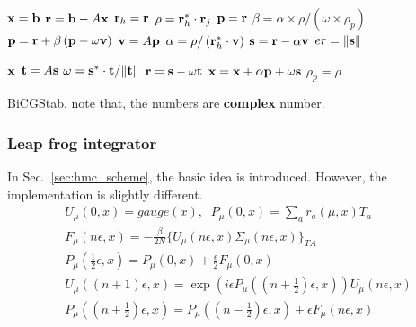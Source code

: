 \begin{algorithm}[H]
\begin{algorithmic}
\State ${\bf x}={\bf b}$
    \State ${\bf r}={\bf b}-A{\bf x}$
    \State ${\bf r}_h={\bf r}$
        \State $\rho = {\bf r}_h^* \cdot {\bf r}_j$
            \State ${\bf p}={\bf r}$
        \Else
            \State $\beta = \alpha \times \rho / (\omega \times \rho_p)$
            \State ${\bf p}={\bf r}+\beta\left({\bf p}-\omega {\bf v}\right)$
        \EndIf
        \State ${\bf v}=A{\bf p}$
        \State $\alpha = \rho / \left({\bf r}_h^*\cdot {\bf v}\right)$
        \State ${\bf s}={\bf r}-\alpha {\bf v}$
            \State $er=\|{\bf s}\|$

                \Return ${\bf x}$
            \EndIf
        \EndIf
        \State ${\bf t}=A{\bf s}$
        \State $\omega = {\bf s}^*\cdot {\bf t}/\|{\bf t}\|$
        \State ${\bf r}={\bf s}-\omega {\bf t}$
        \State ${\bf x}={\bf x}+\alpha {\bf p}+\omega {\bf s}$
        \State $\rho _p=\rho$
    \EndFor
\EndFor
\end{algorithmic}
\caption{\label{alg.BiCGStab}BiCGStab, note that, the numbers are \textbf{complex} number.}
\end{algorithm}

\subsubsection{\label{sec:Leap frog}Leap frog integrator}

In Sec.~\ref{sec:hmc_scheme}, the basic idea is introduced. However, the implementation is slightly different.
\begin{subequations}
\begin{eqnarray}
&U_{\mu}(0,x)=gauge(x),\;\;P_{\mu}(0,x)=\sum _{a}r_a(\mu,x)T_a\\
&F_{\mu}(n\epsilon,x)=-\frac{\beta}{2N}\{U_{\mu}(n\epsilon,x)\Sigma _{\mu}(n\epsilon,x)\}_{TA}\\
&P_{\mu}(\frac{1}{2}\epsilon,x)=P_{\mu}(0,x)+\frac{\epsilon}{2}F_{\mu}(0,x)\\
&U_{\mu}((n+1)\epsilon,x)=\exp \left(i\epsilon P_{\mu}((n+\frac{1}{2})\epsilon,x)\right)U_{\mu}(n\epsilon,x)\\
&P_{\mu}((n+\frac{1}{2})\epsilon,x)=P_{\mu}((n-\frac{1}{2})\epsilon,x)+\epsilon F_{\mu}(n\epsilon,x)
\end{eqnarray}
\label{eq.hmc.update_leapfrog}
\end{subequations}

